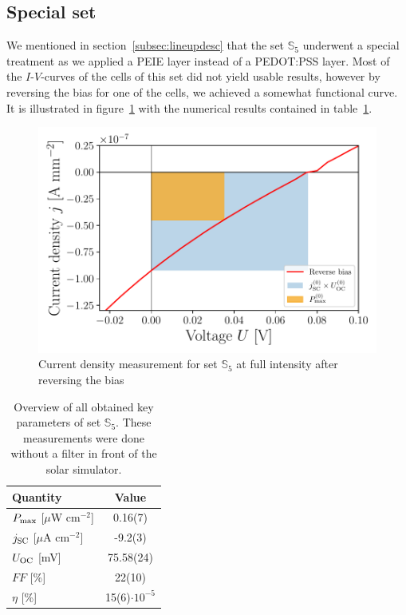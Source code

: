 \documentclass[a4paper,10pt,twocolumn]{article}
\begin{document}
\begin{extract*}
\subsection{Special set}
We mentioned in section~\ref{subsec:lineupdesc} that the set $\mathbb{S}_5$ underwent a special treatment as we applied a PEIE layer instead of a PEDOT:PSS layer. Most of the $I$-$V$-curves of the cells of this set did not yield usable results, however by reversing the bias for one of the cells, we achieved a somewhat functional curve. It is illustrated in figure~\ref{fig:OSC5graph} with the numerical results contained in table~\ref{tab:OSC5table}.
\begin{figure}[h]
	\centering
	\includegraphics[width=\columnwidth]{../../../IV-Curve-Analysis/OSC5Graph.pdf}
	\caption{Current density measurement for set $\mathbb{S}_5$ at full intensity after reversing the bias}
	\label{fig:OSC5graph}
\end{figure}

\begin{table}[h]
	\centering
	\caption{Overview of all obtained key parameters of set $\mathbb{S}_5$. These measurements were done without a filter in front of the solar simulator.}
	\label{tab:OSC5table}
	\begin{tabular}{@{}lc@{}}
		\toprule
		 Quantity&Value\\\midrule 
		$P_{\text{max}}$ [$\mu$W cm$^{-2}$] & 0.16(7) \\
		$j_{\text{SC}}$ [$\mu$A $\mathrm{cm}^{-2}$]             & -9.2(3)                     \\ 
		$U_{\text{OC}}$ [mV]                                    & 75.58(24)                   \\
		$FF$ [\%]                                      & 22(10)                      \\ 
		$\eta$ [\%]                                    & 15(6)$\cdot 10^{-5}$                  \\ \bottomrule
	\end{tabular}
\end{table}
\end{extract*}
\end{document}
